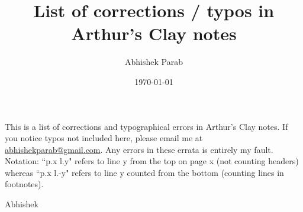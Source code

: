 \documentclass[11pt]{amsart}
\theoremstyle{remark}
\begin{document}
\title{List of corrections / typos in Arthur's Clay notes}
\author{ Abhishek Parab}
\date{\today}                       %

\maketitle

This is a list of corrections and typographical errors in Arthur's Clay notes. If you notice typos not included here, please email me at \href{mailto:abhishekparab@gmail.com}{abhishekparab@gmail.com}. Any errors in these errata is entirely my fault. Notation: ``p.x l.y" refers to line y from the top on page x (not counting headers) whereas ``p.x l.-y" refers to line y counted from the bottom (counting lines in footnotes).

\hfill Abhishek\\[2em]
\end{document}
